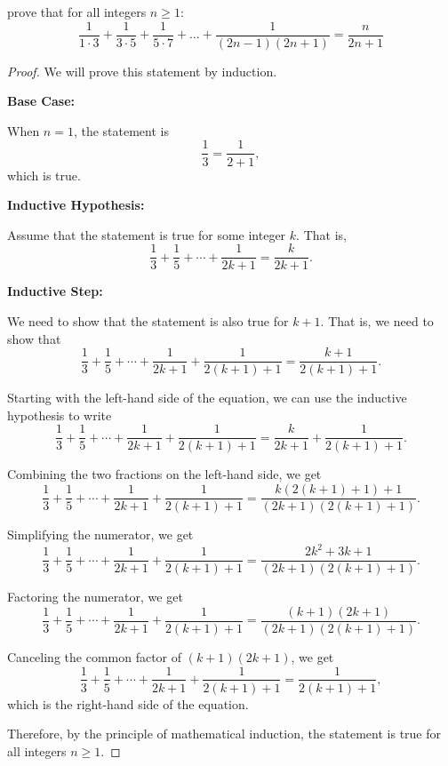 \documentclass[
	12pt, %
	fleqn, %
	a4paper, %
]{LegrandOrangeBook}
\begin{document}
\begin{exercise}
    prove that for all integers $n \geq 1$:
\[
\frac{1}{1 \cdot 3} + \frac{1}{3 \cdot 5} + \frac{1}{5 \cdot 7} + \dots + \frac{1}{(2n - 1)(2n + 1)} = \frac{n}{2n + 1}
\]
\end{exercise}
\begin{proof}
We will prove this statement by induction.

\textbf{Base Case:}

When $n = 1$, the statement is $$\frac{1}{3} = \frac{1}{2+1},$$ which is true.

\textbf{Inductive Hypothesis:}

Assume that the statement is true for some integer $k$. That is, $$\frac{1}{3} + \frac{1}{5} + \cdots + \frac{1}{2k+1} = \frac{k}{2k+1}.$$

\textbf{Inductive Step:}

We need to show that the statement is also true for $k+1$. That is, we need to show that $$\frac{1}{3} + \frac{1}{5} + \cdots + \frac{1}{2k+1} + \frac{1}{2(k+1)+1} = \frac{k+1}{2(k+1)+1}.$$

Starting with the left-hand side of the equation, we can use the inductive hypothesis to write $$\frac{1}{3} + \frac{1}{5} + \cdots + \frac{1}{2k+1} + \frac{1}{2(k+1)+1} = \frac{k}{2k+1} + \frac{1}{2(k+1)+1}.$$

Combining the two fractions on the left-hand side, we get $$\frac{1}{3} + \frac{1}{5} + \cdots + \frac{1}{2k+1} + \frac{1}{2(k+1)+1} = \frac{k(2(k+1)+1) + 1}{(2k+1)(2(k+1)+1)}.$$

Simplifying the numerator, we get $$\frac{1}{3} + \frac{1}{5} + \cdots + \frac{1}{2k+1} + \frac{1}{2(k+1)+1} = \frac{2k^2 + 3k + 1}{(2k+1)(2(k+1)+1)}.$$

Factoring the numerator, we get $$\frac{1}{3} + \frac{1}{5} + \cdots + \frac{1}{2k+1} + \frac{1}{2(k+1)+1} = \frac{(k+1)(2k+1)}{(2k+1)(2(k+1)+1)}.$$

Canceling the common factor of $(k+1)(2k+1)$, we get $$\frac{1}{3} + \frac{1}{5} + \cdots + \frac{1}{2k+1} + \frac{1}{2(k+1)+1} = \frac{1}{2(k+1)+1},$$ which is the right-hand side of the equation.

Therefore, by the principle of mathematical induction, the statement is true for all integers $n \geq 1$.
\end{proof}
\end{document}
